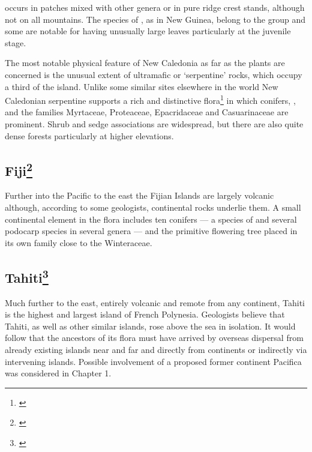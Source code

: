  occurs in patches mixed with other genera or in pure ridge crest stands, although not on all mountains.
The species of , as in New Guinea, belong to the  group and some are notable for having unusually large leaves particularly at the juvenile stage.

The most notable physical feature of New Caledonia as far as the plants are concerned is the unusual extent of ultramafic or `serpentine' rocks, which occupy a third of the island.
Unlike some similar sites elsewhere in the world New Caledonian serpentine supports a rich and distinctive flora\footnote{\cite{moratph1986affinites}} in which conifers, , and the families Myrtaceae, Proteaceae, Epacridaceae and Casuarinaceae are prominent.
Shrub and sedge associations are widespread, but there are also quite dense forests particularly at higher elevations.

\subsection[Fiji]{Fiji\footnote{\cite{carlquist1965island}}}

Further into the Pacific to the east the Fijian Islands are largely volcanic although, according to some geologists, continental rocks underlie them.
A small continental element in the flora includes ten conifers --- a species of  and several podocarp species in several genera --- and the primitive flowering tree  placed in its own family close to the Winteraceae.

\subsection[Tahiti]{Tahiti\footnote{\cite{carlquist1965island}}}

Much further to the east, entirely volcanic and remote from any continent, Tahiti is the highest and largest island of French Polynesia.
Geologists believe that Tahiti, as well as other similar islands, rose above the sea in isolation.
It would follow that the ancestors of its flora must have arrived by overseas dispersal from already existing islands near and far and directly from continents or indirectly via intervening islands.
Possible involvement of a proposed former continent Pacifica was considered in Chapter 1.

